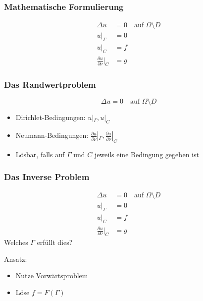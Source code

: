 \documentclass{beamer}
\begin{document}
\begin{frame}
	\frametitle{Mathematische Formulierung}
	\begin{minipage}{0.50\textwidth}
		\begin{figure}
			\centering
		\end{figure}
	\end{minipage}
	\hfill
	\begin{minipage}{0.48\textwidth}
		\pause
		\begin{align*}
			\Delta u &= 0 \quad \text{auf $\Omega \setminus D$} \\
			u|_\Gamma &= 0 \\
			u|_C &= f \\
			\tfrac{\partial u}{\partial \nu}|_C &= g
		\end{align*}
	\end{minipage}
\end{frame}

\begin{frame}
	\frametitle{Das Randwertproblem}
	\[
		\Delta u = 0 \quad \text{auf $\Omega \setminus D$}
	\]
	\begin{itemize}
		\item
			Dirichlet-Bedingungen: $u|_\Gamma, u|_C$
		\item
			Neumann-Bedingungen: $\frac{\partial u}{\partial \nu}|_\Gamma, \frac{\partial u}{\partial \nu}|_C$
		\item
			Lösbar, falls auf $\Gamma$ und $C$ jeweils eine Bedingung gegeben ist
	\end{itemize}
\end{frame}

\begin{frame}
	\frametitle{Das Inverse Problem}
	\begin{minipage}{0.5\textwidth}
		\begin{align*}
			\Delta u &= 0 \quad \text{auf $\Omega \setminus D$} \\
			u|_\Gamma &= 0 \\
			u|_C &= f \\
			\tfrac{\partial u}{\partial \nu}|_C &= g
		\end{align*}
		\pause
		Welches $\Gamma$ erfüllt dies?
	\end{minipage}
	\begin{minipage}{0.48\textwidth}
		\pause
		Ansatz:
		\begin{itemize}
			\item
				Nutze Vorwärtsproblem
			\item \pause
				Löse $f = F(\Gamma)$
		\end{itemize}
	\end{minipage}
\end{frame}
\end{document}
